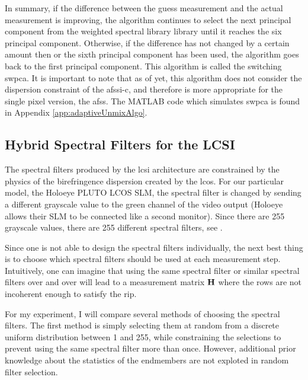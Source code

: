 In summary, if the difference between the guess measurement and the actual measurement is improving, the algorithm continues to select the next principal component from the weighted spectral library library until it reaches the six principal component. Otherwise, if the difference has not changed by a certain amount then or the sixth principal component has been used, the algorithm goes back to the first principal component. This algorithm is called the switching \gls{swpca}. It is important to note that as of yet, this algorithm does not consider the dispersion constraint of the \gls{afssi-c}, and therefore is more appropriate for the single pixel version, the \gls{afss}. The MATLAB code which simulates \gls{swpca} is found in Appendix \ref{app:adaptiveUnmixAlgo}.


\subsection{Hybrid Spectral Filters for the LCSI}

The spectral filters produced by the \gls{lcsi} architecture are constrained by the physics of the birefringence dispersion created by the \gls{lcos}. For our particular model, the Holoeye PLUTO LCOS SLM, the spectral filter is changed by sending a different grayscale value to the green channel of the video output (Holoeye allows their SLM to be connected like a second monitor). Since there are 255 grayscale values, there are 255 different spectral filters, see . 

Since one is not able to design the spectral filters individually, the next best thing is to choose which spectral filters should be used at each measurement step. Intuitively, one can imagine that using the same spectral filter or similar spectral filters over and over will lead to a measurement matrix $\displaystyle \mathbf{H}$ where the rows are not incoherent enough to satisfy the \acrfull{rip}. 

For my experiment, I will compare several methods of choosing the spectral filters. The first method is simply selecting them at random from a discrete uniform distribution between 1 and 255, while constraining the selections to prevent using the same spectral filter more than once. However, additional prior knowledge about the statistics of the endmembers are not exploted in random filter selection. 

